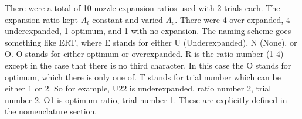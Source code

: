 There were a total of 10 nozzle expansion ratios used with 2 trials each. The expansion ratio kept $A_t$ constant and varied $A_e$. There were 4 over expanded, 4 underexpanded, 1 optimum, and 1 with no expansion. The naming scheme goes something like ERT, where E stands for either U (Underexpanded), N (None), or O. O stands for either optimum or overexpanded. R is the ratio number (1-4) except in the case that there is no third character. In this case the O stands for optimum, which there is only one of. T stands for trial number which can be either 1 or 2. So for example, U22 is underexpanded, ratio number 2, trial number 2. O1 is optimum ratio, trial number 1. These are explicitly defined in the nomenclature section.%
%
%
%
%
%
%
%
%
%
%
%
%
%
%
%
%
%
%
%
